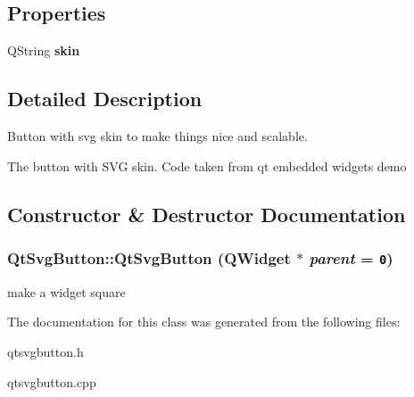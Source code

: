 \subsection*{Properties}
\begin{CompactItemize}
\item 
\hypertarget{classQtSvgButton_91c027d79fa7de0708dc991999031398}{
QString \textbf{skin}}
\label{classQtSvgButton_91c027d79fa7de0708dc991999031398}

\end{CompactItemize}


\subsection{Detailed Description}
Button with svg skin to make things nice and scalable. 

The button with SVG skin. Code taken from qt embedded widgets demo 

\subsection{Constructor \& Destructor Documentation}
\hypertarget{classQtSvgButton_0d4ef1d4c1a5aaa69ac39590c0c4354b}{
\subsubsection[{QtSvgButton}]{\setlength{\rightskip}{0pt plus 5cm}QtSvgButton::QtSvgButton (QWidget $\ast$ {\em parent} = {\tt 0})}}
\label{classQtSvgButton_0d4ef1d4c1a5aaa69ac39590c0c4354b}




make a widget square 

The documentation for this class was generated from the following files:\begin{CompactItemize}
\item 
qtsvgbutton.h\item 
qtsvgbutton.cpp\end{CompactItemize}
